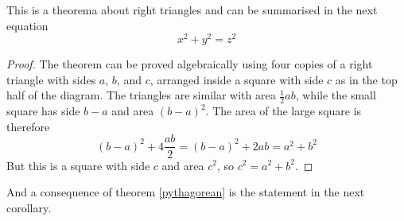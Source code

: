 \begin{theorem}
  \label{pythagorean}
  This is a theorema about right triangles and can be summarised in the next 
  equation 
  \[ x^2 + y^2 = z^2 \]
\end{theorem}

\begin{proof}
  The theorem can be proved algebraically using four copies of a right triangle with sides $a$, $b$, and $c$, arranged inside a square with side $c$ as in the top half of the diagram. The triangles are similar with area $\tfrac12ab$, while the small square has side $b-a$ and area $(b-a)^2$. The area of the large square is therefore
  $$(b-a)^2+4\frac{ab}{2} = (b-a)^2+2ab = a^2+b^2$$  
  But this is a square with side $c$ and area $c^2$, so $c^2 = a^2 + b^2$.
\end{proof}

And a consequence of theorem \ref{pythagorean} is the statement in the next 
corollary.
